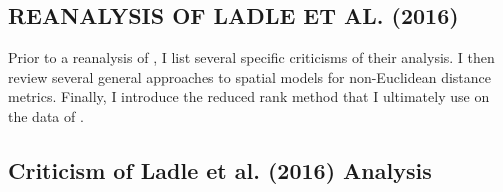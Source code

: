 \documentclass[11pt, titlepage]{article}\usepackage[]{graphicx}\usepackage[]{color}
\begin{document}
\begin{spacing}{1.9}
\begin{flushleft}










\section*{REANALYSIS OF LADLE ET AL. (2016)}

Prior to a reanalysis of \citet{Ladl:Avga:Whea:Boyc:pred:2016}, I list several specific criticisms of their analysis.  I then review several general approaches to spatial models for non-Euclidean distance metrics. Finally, I introduce the reduced rank method that I ultimately use on the data of \citet{Ladl:Avga:Whea:Boyc:pred:2016}.

\subsection*{Criticism of Ladle et al. (2016) Analysis}


\end{flushleft}
\end{spacing}
\end{document}
